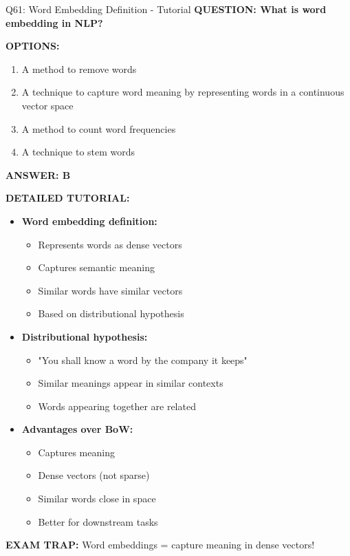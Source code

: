 \documentclass[8pt]{beamer}
\begin{document}
	
	\begin{frame}{Q61: Word Embedding Definition - Tutorial}
		\fontsize{6.5}{7.5}\selectfont
		\textbf{QUESTION: What is word embedding in NLP?}
		
		\vspace{0.1cm}
		\textbf{OPTIONS:}
		\begin{enumerate}
			\item A method to remove words
			\item A technique to capture word meaning by representing words in a continuous vector space
			\item A method to count word frequencies
			\item A technique to stem words
		\end{enumerate}
		
		\vspace{0.1cm}
		\textcolor{myblue}{\textbf{ANSWER: B}}
		
		\vspace{0.1cm}
		\textbf{DETAILED TUTORIAL:}
		\begin{itemize}
			\item \textbf{Word embedding definition:}
			\begin{itemize}
				\item Represents words as dense vectors
				\item Captures semantic meaning
				\item Similar words have similar vectors
				\item Based on distributional hypothesis
			\end{itemize}
			\item \textbf{Distributional hypothesis:}
			\begin{itemize}
				\item "You shall know a word by the company it keeps"
				\item Similar meanings appear in similar contexts
				\item Words appearing together are related
			\end{itemize}
			\item \textbf{Advantages over BoW:}
			\begin{itemize}
				\item Captures meaning
				\item Dense vectors (not sparse)
				\item Similar words close in space
				\item Better for downstream tasks
			\end{itemize}
		\end{itemize}
		
		\textcolor{myred}{\textbf{EXAM TRAP:}} Word embeddings = \textcolor{myblue}{capture meaning in dense vectors}!
	\end{frame}
	
\end{document}
